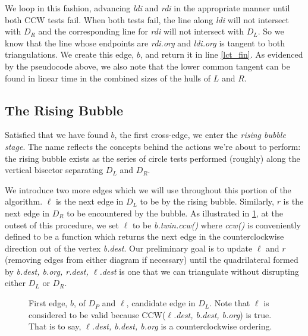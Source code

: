 \documentclass[12pt,twoside]{reedthesis}
\begin{document}
      We loop in this fashion, advancing \textit{ldi} and \textit{rdi} in the appropriate manner until both \textsc{CCW} tests fail. When both tests fail, the line along \textit{ldi} will not intersect with $D_{R}$ and the corresponding line for \textit{rdi} will not intersect with $D_{L}$. So we know that the line whose endpoints are \textit{rdi.org} and \textit{ldi.org} is tangent to both triangulations. We create this edge, $b$, and return it in line \ref{lct_fin}. As evidenced by the pseudocode above, we also note that the lower common tangent can be found in linear time in the combined sizes of the hulls of $L$ and $R$. \par

    \subsection{The Rising Bubble} %
    \label{sub:the_rising_bubble}

      Satisfied that we have found $b$, the first cross-edge, we enter the \emph{rising bubble stage}. The name reflects the concepts behind the actions we're about to perform: the rising bubble exists as the series of circle tests performed (roughly) along the vertical bisector separating $D_{L}$ and $D_{R}$.\par
      
      We introduce two more edges which we will use throughout this portion of the algorithm. $\ell$ is the next edge in $D_{L}$ to be  by the rising bubble. Similarly, $r$ is the next edge in $D_{R}$ to be encountered by the bubble. As illustrated in \cref{fig:del_knit0}, at the outset of this procedure, we set $\ell$ to be \emph{b.twin.ccw()} where \emph{ccw()} is conveniently defined to be a function which returns the next edge in the counterclockwise direction out of the vertex \emph{b.dest}. Our preliminary goal is to update $\ell$ and $r$ (removing edges from either diagram if necessary) until the quadrilateral formed by \textit{b.dest, b.org, r.dest, $\ell$.dest} is one that we can triangulate without disrupting either $D_{L}$ or $D_{R}$.\par 

      \begin{figure}[H]
        \centering
        \begin{subtable}{\textwidth}
          \centering
          
          \caption{First edge, $b$, of $D_{P}$ and $\ell$, candidate edge in $D_{L}$. Note that $\ell$ is considered to be valid because \textsc{CCW}(\textit{$\ell$.dest, b.dest, b.org}) is true. That is to say, \textit{$\ell$.dest, b.dest, b.org} is a counterclockwise ordering.}
          \label{fig:del_knit0}
        \end{subtable}
      \end{figure}
\end{document}
